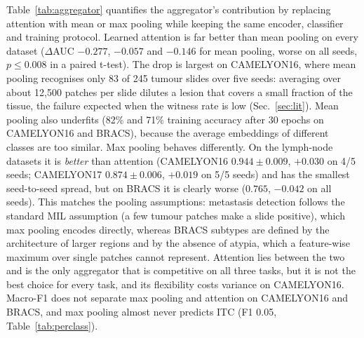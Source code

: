 \documentclass[conference]{IEEEtran}
\begin{document}
Table~\ref{tab:aggregator} quantifies the aggregator's contribution by replacing attention with mean or max pooling while keeping the same encoder, classifier and training protocol.
Learned attention is far better than mean pooling on every dataset ($\Delta$AUC $-0.277$, $-0.057$ and $-0.146$ for mean pooling, worse on all seeds, $p\le0.008$ in a paired t-test). The drop is largest on CAMELYON16, where mean pooling recognises only 83 of 245 tumour slides over five seeds: averaging over about 12{,}500 patches per slide dilutes a lesion that covers a small fraction of the tissue, the failure expected when the witness rate is low (Sec.~\ref{sec:lit}). Mean pooling also underfits (82\% and 71\% training accuracy after 30 epochs on CAMELYON16 and BRACS), because the average embeddings of different classes are too similar. Max pooling behaves differently. On the lymph-node datasets it is \emph{better} than attention (CAMELYON16 $0.944\pm0.009$, $+0.030$ on 4/5 seeds; CAMELYON17 $0.874\pm0.006$, $+0.019$ on 5/5 seeds) and has the smallest seed-to-seed spread, but on BRACS it is clearly worse ($0.765$, $-0.042$ on all seeds). This matches the pooling assumptions: metastasis detection follows the standard MIL assumption (a few tumour patches make a slide positive), which max pooling encodes directly, whereas BRACS subtypes are defined by the architecture of larger regions and by the absence of atypia, which a feature-wise maximum over single patches cannot represent. Attention lies between the two and is the only aggregator that is competitive on all three tasks, but it is not the best choice for every task, and its flexibility costs variance on CAMELYON16. Macro-F1 does not separate max pooling and attention on CAMELYON16 and BRACS, and max pooling almost never predicts ITC (F1 0.05, Table~\ref{tab:perclass}).
\end{document}
